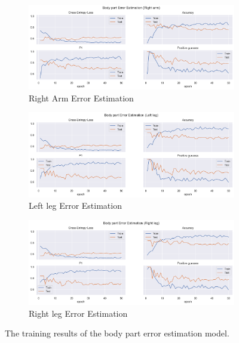 \begin{figure}[ht]
  \begin{subfigure}[b]{0.9\linewidth}
      \centering
      \includegraphics[width=\textwidth]{figures/Results/v1/bp/Right arm_ErrorEstimation.png}
      \caption{Right Arm Error Estimation}
      \label{fig:riar_lb_ee}
  \end{subfigure}
  \hfill
  \begin{subfigure}[b]{0.9\linewidth}
      \centering
      \includegraphics[width=\textwidth]{figures/Results/v1/bp/Left leg_ErrorEstimation.png}
      \caption{Left leg Error Estimation}
      \label{fig:lele_lb_ee}
  \end{subfigure}
  \hfill
  \begin{subfigure}[b]{0.9\linewidth}
      \centering
      \includegraphics[width=\textwidth]{figures/Results/v1/bp/Right leg_ErrorEstimation.png}
      \caption{Right leg Error Estimation}
      \label{fig:rileg_lb_ee}
  \end{subfigure}
  \hfill
  \caption[Body Parts model training results]{The training results of the body part error estimation model.}
  \label{fig:body part_training_results}
\end{figure}

